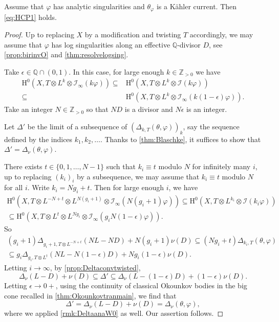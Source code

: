 \begin{lemma}\label{lma:twistedHcp}
    Assume that $\varphi$ has analytic singularities and $\theta_{\varphi}$ is a Kähler current. Then \eqref{eq:HCP1} holds.
\end{lemma}
\begin{proof}
    Up to replacing $X$ by a modification and twisting $T$ accordingly, we may assume that $\varphi$ has log singularities along an effective $\mathbb{Q}$-divisor $D$, see \cref{prop:birinvO} and \cref{thm:resolvelogsing}.

    Take $\epsilon\in \mathbb{Q}\cap (0,1)$.
    In this case, for large enough $k\in \mathbb{Z}_{>0}$ we have
    \[
    \begin{split}
        \mathrm{H}^0\left(X,T\otimes L^k\otimes \mathcal{I}_{\infty}(k\varphi)\right) \subseteq & \mathrm{H}^0\left(X,T\otimes L^k\otimes \mathcal{I}(k\varphi)\right) \\
        \subseteq & \mathrm{H}^0\left(X,T\otimes L^k\otimes \mathcal{I}_{\infty}(k(1-\epsilon)\varphi)\right).
    \end{split}
    \]
    Take an integer $N\in \mathbb{Z}_{>0}$ so that $ND$ is a divisor and $N\epsilon$ is an integer.

    Let $\Delta'$ be the limit of a subsequence of $(\Delta_{k,T}(\theta,\varphi))_k$, say the sequence defined by the indices $k_1,k_2,\ldots$. Thanks to \cref{thm:Blaschke}, it suffices to show that $\Delta'=\Delta_{\nu}(\theta,\varphi)$.


    There exists $t\in \{0,1,\ldots,N-1\}$ such that $k_i\equiv t$ modulo $N$ for infinitely many $i$, up to replacing $(k_i)_i$ by a subsequence, we may assume that $k_i\equiv t$ modulo $N$ for all $i$. Write $k_i=N g_i+t$.
    Then for large enough $i$, we have
    \[
    \begin{split}
        \mathrm{H}^0\left(X,T\otimes L^{-N+t} \otimes L^{N(g_i+1)}\otimes \mathcal{I}_{\infty}\left(N(g_i+1)\varphi\right)\right) \subseteq \mathrm{H}^0\left(X,T\otimes L^{k_i}\otimes \mathcal{I}(k_i\varphi)\right) \\
        \subseteq \mathrm{H}^0\left(X,T\otimes L^t \otimes L^{Ng_i}\otimes \mathcal{I}_{\infty}\left(g_i N(1-\epsilon)\varphi\right)\right).
    \end{split}
    \]
    So
    \[
    \begin{split}
    (g_i+1) \Delta_{g_i+1,T\otimes L^{-N+t}}(NL-ND)+N(g_i+1)\nu(D)\subseteq (Ng_i+t)\Delta_{k_i,T}(\theta,\varphi)\\
    \subseteq
    g_i\Delta_{g_i,T\otimes L^t}\left(NL-N(1-\epsilon)D\right)+Ng_i(1-\epsilon)\nu(D).
    \end{split}
    \]
    Letting $i\to\infty$, by \cref{prop:Deltaconvtwisted},
    \[
        \Delta_{\nu}(L-D)+\nu(D)\subseteq \Delta'\subseteq \Delta_{\nu}(L-(1-\epsilon)D)+(1-\epsilon)\nu(D).
    \]
    Letting $\epsilon\to 0+$, using the continuity of classical Okounkov bodies in the big cone recalled in \cref{thm:Okounkovtranmain}, we find that
    \[
        \Delta'=\Delta_{\nu}(L-D)+\nu(D)=\Delta_{\nu}(\theta,\varphi),
    \]
    where we applied \cref{rmk:DeltaanaW0} as well. Our assertion follows.
\end{proof}

